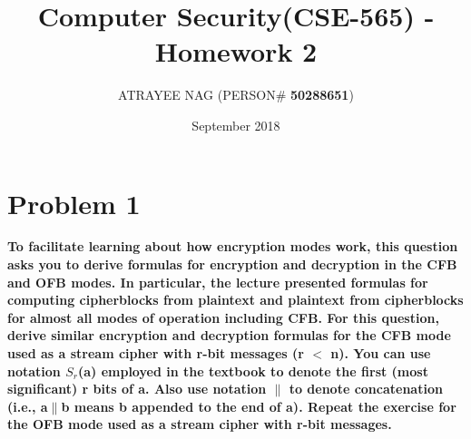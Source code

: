 \documentclass{article}
\title{Computer Security(CSE-565) - Homework 2}
\author{ATRAYEE NAG (PERSON\# \textbf{50288651})}
\date{September 2018}
\begin{document}
\maketitle

\section{Problem 1}
\textbf{To facilitate learning about how encryption modes work, this question asks you to derive formulas for encryption and decryption in the CFB and OFB modes. In particular, the lecture presented formulas for computing cipherblocks from plaintext and plaintext from cipherblocks for almost all modes of operation including CFB. For this question, derive similar encryption and decryption formulas for the CFB mode used as a stream cipher with r-bit messages (r $<$ n). You can use notation $S_r$(a) employed in the textbook to denote the first (most significant) r bits of a. Also use notation $\|$ to denote concatenation (i.e., a$\|$b means b appended to the end of a).
Repeat the exercise for the OFB mode used as a stream cipher with r-bit messages.}
\end{document}
